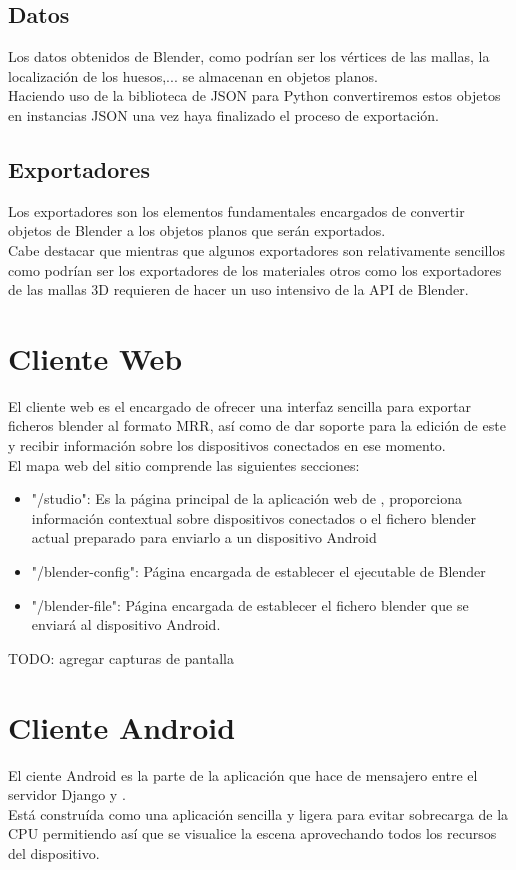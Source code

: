 \subsection{Datos}
Los datos obtenidos de Blender, como podrían ser los vértices de las mallas, la localización de los huesos,... se almacenan en objetos planos.\\
Haciendo uso de la biblioteca de JSON para Python convertiremos estos objetos en instancias JSON una vez haya finalizado el proceso de exportación.

\subsection{Exportadores}
Los exportadores son los elementos fundamentales encargados de convertir objetos de Blender a los objetos planos que serán exportados.\\
Cabe destacar que mientras que algunos exportadores son relativamente sencillos como podrían ser los exportadores de los materiales otros como los exportadores de las mallas 3D requieren de hacer un uso intensivo de la API de Blender.


\section{Cliente Web}
El cliente web es el encargado de ofrecer una interfaz sencilla para exportar ficheros blender al formato MRR, así como de dar soporte para la edición de este y recibir información sobre los dispositivos conectados en ese momento.\\

El mapa web del sitio comprende las siguientes secciones:
\begin{itemize}
\item "\slash studio": Es la página principal de la aplicación web de \studio, proporciona información contextual sobre dispositivos conectados o el fichero blender actual preparado para enviarlo a un dispositivo Android
\item "\slash blender-config": Página encargada de establecer el ejecutable de Blender
\item "\slash blender-file": Página encargada de establecer el fichero blender que se enviará al dispositivo Android.
\end{itemize}
TODO: agregar capturas de pantalla

\section{Cliente Android}
El ciente Android es la parte de la aplicación que hace de mensajero entre el servidor Django y \robotto.\\
Está construída como una aplicación sencilla y ligera para evitar sobrecarga de la CPU permitiendo así que se visualice la escena aprovechando todos los recursos del dispositivo.\\

